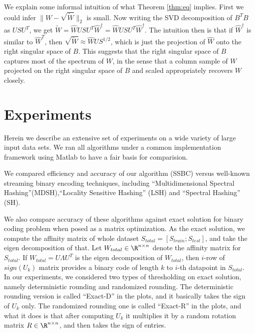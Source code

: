 \documentclass{sig-alternate}
\begin{document}
We explain some informal intuition of what Theorem \ref{thm:eq} implies. First we could infer $\|W - \sqrt{\tilde W} \|_2$ 
is small.  Now writing the SVD decomposition of 
$B^T B$ as $U S U^T$, we get $\tilde W = \hat{W} U S U^T \hat{W}^{\dagger}  = \hat{W} U S U^T \hat{W}^{\dagger}$. The intuition then is that if $\hat{W}^{\dagger}$ is similar to $\hat{W}^T$, then $\sqrt{\tilde W} \approx \hat W U S^{1/2}$, which is just the projection of $\hat W$ onto the right singular space of $B$. 
This suggests that the right singular space of $B$ captures most of the spectrum of $W$, in the sense that a column sample of $W$ projected on the right singular space of $B$ and scaled appropriately recovers $W$ closely. 

\section{Experiments}
\label{sec:exp}
Herein we describe an extensive set of experiments on a wide variety of large input data sets.
We ran all algorithms under a common implementation framework using Matlab to have a fair basis for comparision.

We compared efficiency and accuracy of our algorithm (SSBC) versus well-known streaming binary encoding techniques, including ``Multidimensional Spectral Hashing''(MDSH)\cite{weiss2012multidimensional},``Locality Sensitive Hashing'' (LSH)\cite{datar2004locality} and ``Spectral Hashing'' (SH)\cite{weiss2009spectral}.

We also compare accuracy of these algorithms against exact solution for binary coding problem when posed as a matrix optimization. As the exact solution, we compute the affinity matrix of whole dataset $S_{total} = [S_{train} ; S_{test}]$, and take the eigen decomposition of that. Let $W_{total} \in \R^{n\times n}$ denote the affinity matrix for $S_{total}$. If $W_{total} = U \Lambda U^T$ is the eigen decomposition of $W_{total}$, then $i$-row of $sign(U_k)$ matrix provides a binary code of length $k$ to $i$-th datapoint in $S_{total}$. In our experiments, we considered two types of thresholding on exact solution, namely deterministic rounding and randomized rounding. The deterministic rounding version is called ``Exact-D'' in the plots, and it basically takes the sign of $U_k$ only. The randomized rounding one is called ``Exact-R'' in the plots, and what it does is that after computing $U_k$ it multiplies it by a random rotation matrix $R \in \R^{n \times n}$, and then takes the sign of entries. 
\end{document}
